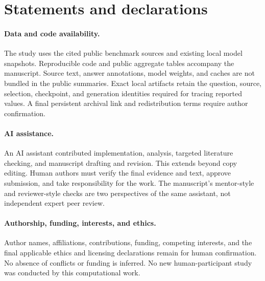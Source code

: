 \documentclass[pdflatex,sn-mathphys-num]{sn-jnl}
\begin{document}
\backmatter
\section*{Statements and declarations}
\paragraph{Data and code availability.}
The study uses the cited public benchmark sources and existing local model
snapshots. Reproducible code and public aggregate tables accompany the
manuscript. Source text, answer annotations, model weights, and caches are
not bundled in the public summaries. Exact local artifacts retain the
question, source, selection, checkpoint, and generation identities required
for tracing reported values. A final persistent archival link and
redistribution terms require author confirmation.
\paragraph{AI assistance.}
An AI assistant contributed implementation, analysis, targeted literature
checking, and manuscript drafting and revision. This extends beyond
copy editing. Human authors must verify the final evidence and text,
approve submission, and take responsibility for the work. The manuscript's
mentor-style and reviewer-style checks are two perspectives of the same
assistant, not independent expert peer review.
\paragraph{Authorship, funding, interests, and ethics.}
Author names, affiliations, contributions, funding, competing interests,
and the final applicable ethics and licensing declarations remain for
human confirmation. No absence of conflicts or funding is inferred. No
new human-participant study was conducted by this computational work.


\end{document}
